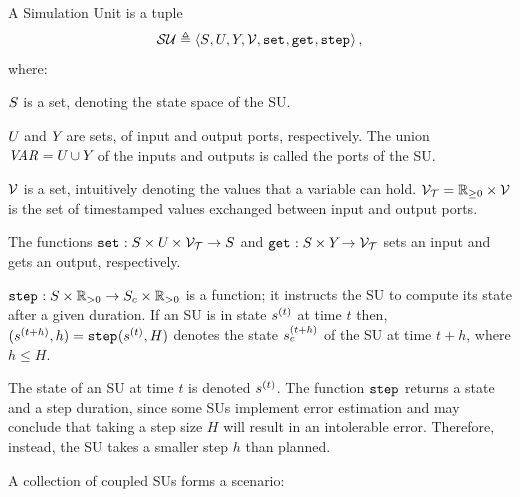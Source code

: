 \begin{definition}\label{def:fmu}
  A Simulation Unit is a tuple
  $$\mathcal{SU} \triangleq  \left\langle S_{}, U_{}, Y_{}, \mathcal{V}, \mathtt{set}_{}, \mathtt{get}_{}, \mathtt{step}_{} \right\rangle ,$$
  where:
  \begin{compactitem}
    \item $S_{}$ is a set, denoting the state space of the SU.
    \item $U_{}$ and $Y_{}$ are sets, of input and output ports, respectively.
    The union $\mathit{VAR_{}} = U_{} \cup Y_{}$ of the inputs and outputs is called the ports of the SU.
    \item $\mathcal{V}$ is a set, intuitively denoting the values that a variable can hold.
    $\mathcal{V_{T}} = \mathbb{R}_{\geq 0} \times \mathcal{V}$ is the set of timestamped values exchanged between input and output ports.
    \item 
    The functions
    $\mathtt{set}_{} : S_{} \times U_{} \times \mathcal{V_{T}} \to S_{}$ and $\mathtt{get}_{}: S_{} \times Y_{} \to \mathcal{V_{T}}$ sets an input and gets an output, respectively. 
    \item $\mathtt{step}_{}: S_{} \times \mathbb{R}_{> 0} \to S_{c} \times \mathbb{R}_{> 0} $ is a function; it instructs the SU to compute its state after a given duration. 
    If an SU is in state $s_{}^{(t)}$ at time $t$ then, $(s_{}^{(t+h)}, h) = \mathtt{step}_{}(s_{}^{(t)}, H)$ denotes the state $s_{c}^{(t+h)}$ of the SU at time $t+h$, where $h \leq H$. 
  \end{compactitem}
\end{definition}

The state of an SU at time $t$ is denoted $s_{}^{(t)}$.
The function $\mathtt{step}_{}$ returns a state and a step duration, since some SUs implement error estimation and may conclude that taking a step size $H$ will result in an intolerable error.
Therefore, instead, the SU takes a smaller step $h$ than planned.

A collection of coupled SUs forms a scenario:

